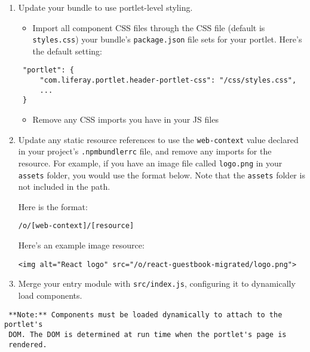 \begin{enumerate}
\def\labelenumi{\arabic{enumi}.}
\setcounter{enumi}{3}
\item
  Update your bundle to use portlet-level styling.

  \begin{itemize}
  \tightlist
  \item
    Import all component CSS files through the CSS file (default is
    \texttt{styles.css}) your bundle's \texttt{package.json} file sets
    for your portlet. Here's the default setting:
  \end{itemize}

\begin{verbatim}
 "portlet": {
     "com.liferay.portlet.header-portlet-css": "/css/styles.css",
     ...
 }
\end{verbatim}

  \begin{itemize}
  \tightlist
  \item
    Remove any CSS imports you have in your JS files
  \end{itemize}
\item
  Update any static resource references to use the \texttt{web-context}
  value declared in your project's \texttt{.npmbundlerrc} file, and
  remove any imports for the resource. For example, if you have an image
  file called \texttt{logo.png} in your \texttt{assets} folder, you
  would use the format below. Note that the \texttt{assets} folder is
  not included in the path.

  Here is the format:

\begin{verbatim}
/o/[web-context]/[resource]
\end{verbatim}

  Here's an example image resource:

\begin{verbatim}
<img alt="React logo" src="/o/react-guestbook-migrated/logo.png">
\end{verbatim}
\item
  Merge your entry module with \texttt{src/index.js}, configuring it to
  dynamically load components.
\end{enumerate}

\noindent\hrulefill

\begin{verbatim}
 **Note:** Components must be loaded dynamically to attach to the portlet's
 DOM. The DOM is determined at run time when the portlet's page is
 rendered. 
\end{verbatim}


